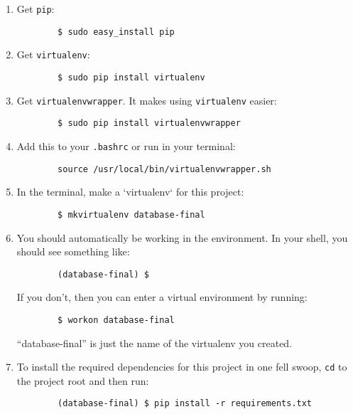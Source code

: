 \documentclass{article}
\begin{document}
\begin{enumerate}
    \item
        Get {\tt pip}:
        \begin{verbatim}
        $ sudo easy_install pip
        \end{verbatim}

    \item
        Get {\tt virtualenv}:
        \begin{verbatim}
        $ sudo pip install virtualenv
        \end{verbatim}

    \item
        Get {\tt virtualenvwrapper}. It makes using {\tt virtualenv} easier:
        \begin{verbatim}
        $ sudo pip install virtualenvwrapper
        \end{verbatim}

    \item
        Add this to your {\tt .bashrc} or run in your terminal:
        \begin{verbatim}
        source /usr/local/bin/virtualenvwrapper.sh
        \end{verbatim}

    \item 
        In the terminal, make a `virtualenv` for this project:
        \begin{verbatim}
        $ mkvirtualenv database-final
        \end{verbatim}

    \item 
        You should automatically be working in the environment. In your shell,
you should see something like:
        \begin{verbatim}
        (database-final) $ 
        \end{verbatim}
        If you don't, then you can enter a virtual environment by running:
        \begin{verbatim}
        $ workon database-final
        \end{verbatim}
        ``database-final'' is just the name of the virtualenv you created.

    \item To install the required dependencies for this project in one fell swoop,
        {\tt cd} to the project root and then run:
        \begin{verbatim}
        (database-final) $ pip install -r requirements.txt
        \end{verbatim}


\end{enumerate}
\end{document}
